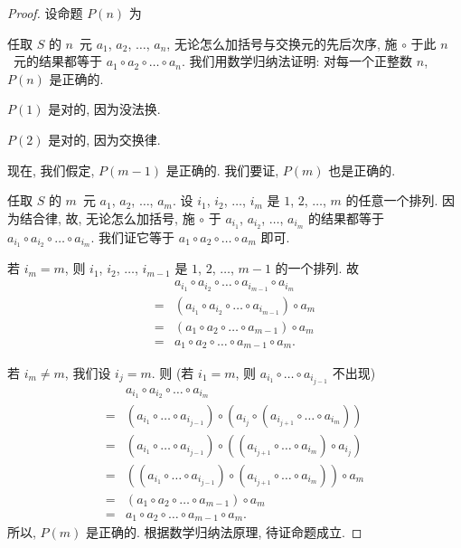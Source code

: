 \documentclass[%
    UTF8,%
    fontset=none,%
    punct=kaiming,%
    zihao=-4,%
    a4paper,%
    oneside,%
]{ctexbook}
\makeatletter
\renewenvironment{quotation}
{\list{}{\listparindent 2\ccwd%
\itemindent\listparindent
\leftmargin\rightmargin
\parsep\z@ \@plus\p@}%
\item\relax}
{\endlist}
\makeatother
\begin{document}
\begin{proof}
    设命题 \(P(n)\) 为
    \begin{quotation}
        任取 \(S\) 的 \(n\)~元
        \(a_1\), \(a_2\), \(\dots\), \(a_n\),
        无论怎么加括号与交换元的先后次序,
        施 \(\circ\) 于此 \(n\)~元的结果都等于
        \(a_1 \circ a_2 \circ \dots \circ a_n\).
    \end{quotation}
    我们用数学归纳法证明:
    对每一个正整数 \(n\), \(P(n)\) 是正确的.

    \(P(1)\) 是对的, 因为没法换.

    \(P(2)\) 是对的, 因为交换律.

    现在, 我们假定, \(P(m-1)\) 是正确的.
    我们要证, \(P(m)\) 也是正确的.

    任取 \(S\) 的 \(m\)~元
    \(a_1\), \(a_2\), \(\dots\), \(a_m\).
    设 \(i_1\), \(i_2\), \(\dots\), \(i_m\)
    是 \(1\), \(2\), \(\dots\), \(m\)
    的任意一个排列.
    因为结合律, 故, 无论怎么加括号,
    施 \(\circ\) 于
    \(a_{i_1}\), \(a_{i_2}\), \(\dots\), \(a_{i_m}\)
    的结果都等于
    \(a_{i_1} \circ a_{i_2} \circ \dots \circ a_{i_m}\).
    我们证它等于
    \(a_1 \circ a_2 \circ \dots \circ a_m\)
    即可.

    若 \(i_m = m\),
    则 \(i_1\), \(i_2\), \(\dots\), \(i_{m-1}\)
    是 \(1\), \(2\), \(\dots\), \(m-1\)
    的一个排列.
    故
    \begin{align*}
             & a_{i_1} \circ a_{i_2} \circ
        \dots \circ a_{i_{m-1}} \circ a_{i_m}               \\
        = {} &
        (a_{i_1} \circ a_{i_2} \circ
        \dots \circ a_{i_{m-1}}) \circ a_m                  \\
        = {} &
        (a_1 \circ a_2 \circ \dots \circ a_{m-1}) \circ a_m \\
        = {} &
        a_1 \circ a_2 \circ \dots \circ a_{m-1} \circ a_m.
    \end{align*}

    若 \(i_m \neq m\),
    我们设 \(i_j = m\).
    则
    (若 \(i_1 = m\),
    则 \(a_{i_1} \circ \dots \circ a_{i_{j-1}}\)
    不出现)
    \begin{align*}
             & a_{i_1} \circ a_{i_2} \circ
        \dots \circ a_{i_m}                                 \\
        = {} & (a_{i_1} \circ \dots \circ a_{i_{j-1}})
        \circ (a_{i_j}
        \circ (a_{i_{j+1}} \circ \dots \circ a_{i_m}))      \\
        = {} & (a_{i_1} \circ \dots \circ a_{i_{j-1}})
        \circ ((a_{i_{j+1}} \circ \dots \circ a_{i_m})
        \circ a_{i_j})                                      \\
        = {} & ((a_{i_1} \circ \dots \circ a_{i_{j-1}})
        \circ (a_{i_{j+1}} \circ \dots \circ a_{i_m}))
        \circ a_m                                           \\
        = {} &
        (a_1 \circ a_2 \circ \dots \circ a_{m-1}) \circ a_m \\
        = {} &
        a_1 \circ a_2 \circ \dots \circ a_{m-1} \circ a_m.
    \end{align*}
    所以, \(P(m)\) 是正确的.
    根据数学归纳法原理, 待证命题成立.
\end{proof}
\end{document}
